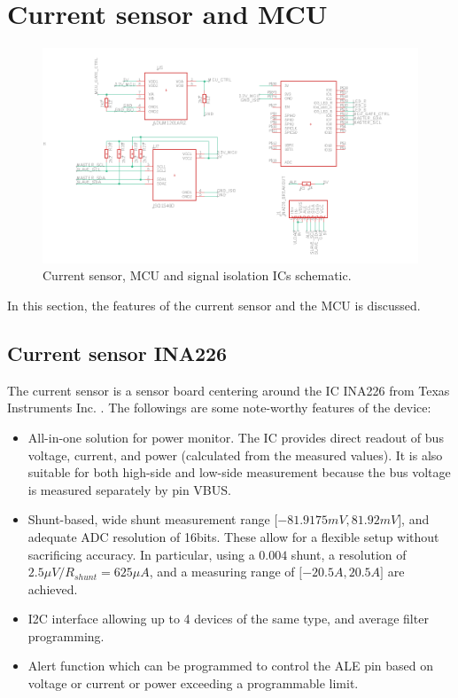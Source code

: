 \documentclass[../main.tex]{subfiles}
\begin{document}
    \section{Current sensor and MCU}
    \begin{figure}[!h]
        \centerline{\includegraphics[width=\linewidth]{media/sensor_mcu_schematic.png}}
        \caption{Current sensor, MCU and signal isolation ICs schematic.}
        \label{fig:latch_circuit_schematic}
    \end{figure}
    In this section, the features of the current sensor and the MCU is discussed.

    \pagebreak
    \subsection{Current sensor INA226}
    \justify
    The current sensor is a sensor board centering around the IC INA226 from Texas Instruments Inc. \cite{INA226}. The followings are some note-worthy features of the device:
    \begin{itemize}
        \item All-in-one solution for power monitor. The IC provides direct readout of bus voltage, current, and power (calculated from the measured values). It is also suitable for both high-side and low-side measurement because the bus voltage is measured separately by pin VBUS.
        \item Shunt-based, wide shunt measurement range $\lbrack-81.9175mV, 81.92mV\rbrack$, and adequate ADC resolution of 16bits. These allow for a flexible setup without sacrificing accuracy. In particular, using a $0.004$ shunt, a resolution of $2.5\mu V / R_{shunt} = 625 \mu A$, and a measuring range of $\lbrack-20.5A, 20.5A\rbrack$ are achieved.
        \item I2C interface allowing up to 4 devices of the same type, and average filter programming.
        \item Alert function which can be programmed to control the ALE pin based on voltage or current or power exceeding a programmable limit.
    \end{itemize}
\end{document}
